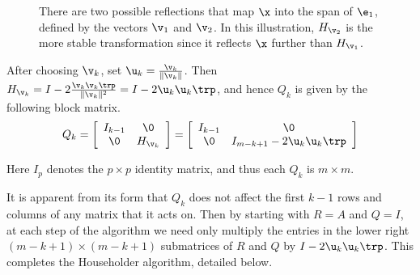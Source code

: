 \begin{figure}[H] %
\caption{There are two possible reflections that map $\x$ into the span of $\e_1$, defined by the vectors $\v_1$ and $\v_2$.
In this illustration, $H_{\v_2}$ is the more stable transformation since it reflects $\x$ further than $H_{\v_1}$.}
\label{fig:householder-two-possible-reflectors}
\end{figure}

After choosing $\v_k$, set $\u_k = \frac{\v_k}{\|\v_k\|}$.
Then $H_{\v_k} = I - 2\frac{\v_k\v_k\trp}{\|\v_k\|^2} = I - 2\u_k\u_k\trp$, and hence $Q_k$ is given by the following block matrix.
%
\begin{equation*}
Q_k =
\left[\begin{array}{cc}
I_{k-1} & \0 \\
\0      & H_{\v_k} \\
\end{array}\right] =
\left[\begin{array}{cc}
I_{k-1} & \0 \\
\0      & I_{m-k+1} - 2 \u_k\u_k\trp \\
\end{array}\right]
\end{equation*}

Here $I_{p}$ denotes the $p \times p$ identity matrix, and thus each $Q_k$ is $m \times m$.

\newpage

It is apparent from its form that $Q_k$ does not affect the first $k-1$ rows and columns of any matrix that it acts on.
Then by starting with $R = A$ and $Q = I$, at each step of the algorithm we need only multiply the entries in the lower right $(m-k+1) \times (m-k+1)$ submatrices of $R$ and $Q$ by $I-2\u_k\u_k\trp$.
This completes the Householder algorithm, detailed below.

